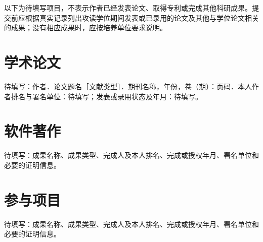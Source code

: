 
\begin{resume}
  以下为待填写项目，不表示作者已经发表论文、取得专利或完成其他科研成果。提交前应根据真实记录列出攻读学位期间发表或已录用的论文及其他与学位论文相关的成果；没有相应成果时，应按培养单位要求说明。

  \section*{学术论文}
  \begin{achievements}
    \item 待填写：作者．论文题名［文献类型］．期刊名称，年份，卷（期）：页码．本人作者排名与署名单位：待填写；发表或录用状态及年月：待填写。
  \end{achievements}

  \section*{软件著作}
  \begin{achievements}
    \item 待填写：成果名称、成果类型、完成人及本人排名、完成或授权年月、署名单位和必要的证明信息。
  \end{achievements}

  \section*{参与项目}
  \begin{achievements}
    \item 待填写：成果名称、成果类型、完成人及本人排名、完成或授权年月、署名单位和必要的证明信息。
  \end{achievements}

\end{resume}
